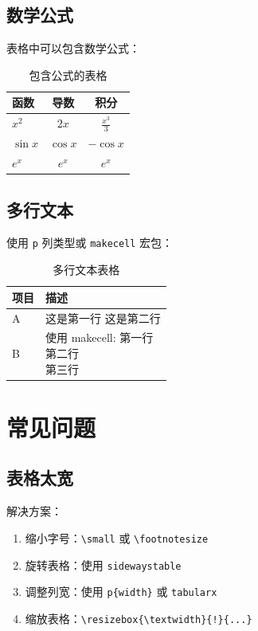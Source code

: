 \subsection{数学公式}

表格中可以包含数学公式：

\begin{table}[htbp]
  \centering
  \caption{包含公式的表格}
  \begin{tabular}{lcc}
    \toprule
    函数 & 导数 & 积分 \\
    \midrule
    $x^2$ & $2x$ & $\frac{x^3}{3}$ \\
    $\sin x$ & $\cos x$ & $-\cos x$ \\
    $e^x$ & $e^x$ & $e^x$ \\
    \bottomrule
  \end{tabular}
\end{table}

\subsection{多行文本}

使用 \texttt{p} 列类型或 \texttt{makecell} 宏包：

\begin{table}[htbp]
  \centering
  \caption{多行文本表格}
  \begin{tabular}{lp{5cm}}
    \toprule
    项目 & 描述 \\
    \midrule
    A & 这是第一行 \newline 这是第二行 \\
    B & 使用 makecell: \makecell[l]{第一行\\第二行\\第三行} \\
    \bottomrule
  \end{tabular}
\end{table}

\section{常见问题}

\subsection{表格太宽}

解决方案：
\begin{enumerate}
  \item 缩小字号：\texttt{\textbackslash small} 或 \texttt{\textbackslash footnotesize}
  \item 旋转表格：使用 \texttt{sidewaystable}
  \item 调整列宽：使用 \texttt{p\{width\}} 或 \texttt{tabularx}
  \item 缩放表格：\texttt{\textbackslash resizebox\{\textbackslash textwidth\}\{!\}\{...\}}
\end{enumerate}

